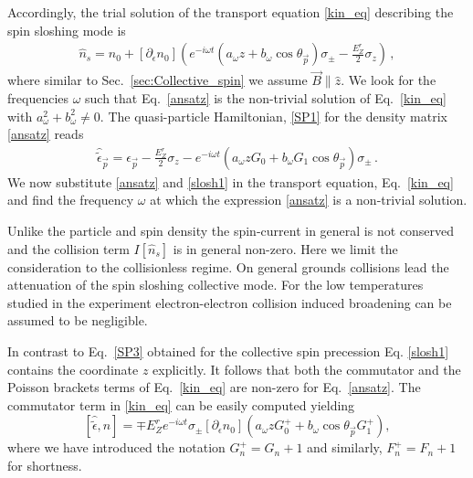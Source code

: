 Accordingly, the trial solution of the transport equation \eqref{kin_eq} describing the spin sloshing mode is 
\begin{align}\label{ansatz}
\hat{n}_{s} =  n_0   + [\partial_{\epsilon} n_0] 
\left(
e^{- i \omega t}( a_{\omega} z + b_{\omega} \cos \theta_{\vec{p}}) \sigma_{\pm} - \frac{E_Z^r}{2}\sigma_z  \right)\, ,
\end{align}
where similar to Sec.~\ref{sec:Collective_spin} we assume $\vec{B} \parallel \hat{z}$.
We look for the frequencies $\omega$ such that Eq.~\eqref{ansatz} is the non-trivial solution of Eq.~\eqref{kin_eq} with $a_{\omega}^2 + b_{\omega}^2 \neq 0$. 
The quasi-particle Hamiltonian, \eqref{SP1} for the density matrix \eqref{ansatz} reads
\begin{align}\label{slosh1}
\hat{\tilde{\epsilon}}_{\vec{p}} = 
\epsilon_{\vec{p}} - \frac{E_Z^r}{2}\sigma_z
- e^{-i \omega t} ( a_{\omega} z G_0 + b_{\omega} G_1\cos \theta_{\vec{p}}) \sigma_{\pm}  \, .
\end{align}
We now substitute \eqref{ansatz} and \eqref{slosh1} in the transport equation, Eq.~\eqref{kin_eq} and find the frequency $\omega$ at which the expression \eqref{ansatz} is a non-trivial solution.


Unlike the particle and spin density the spin-current in general is not conserved and the collision term $I[\hat{n}_s]$ is in general non-zero.
Here we limit the consideration to the collisionless regime.
On general grounds collisions lead the attenuation of the spin sloshing collective mode.
For the low temperatures studied in the experiment \cite{Frolov2009} electron-electron collision induced broadening can be assumed to be negligible.
 
In contrast to Eq.~\eqref{SP3} obtained for the collective spin precession Eq. \eqref{slosh1} contains the coordinate $z$ explicitly.
It follows that both the commutator and the Poisson brackets terms of Eq.~\eqref{kin_eq} are non-zero for Eq.~\eqref{ansatz}.
The commutator term in \eqref{kin_eq} can be easily computed yielding 
\begin{equation}\label{slosh2}
 [ \hat{\tilde{\epsilon}}, \hat{n}] =  
\mp  E_Z^r e^{-i \omega t} \sigma_{\pm}  [\partial_{\epsilon} n_0 ]\left( a_{\omega} z G_0^+ + b_{\omega} \cos \theta_{\vec{p}} G_1^+ \right),
\end{equation}
where we have introduced the notation $G_n^+ = G_n+1$ and similarly,
$F_n^+ = F_n +1$ for shortness.


